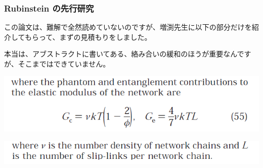 \documentclass[12pt, dvipdfmx]{beamer}
\begin{document}
\begin{frame}
    \frametitle{Rubinstein の先行研究}

        この論文は、難解で全然読めていないのですが、増渕先生に以下の部分だけを紹介してもらって、まずの見積もりをしました。

        本当は、アブストラクトに書いてある、絡み合いの緩和のほうが重要なんですが、そこまではできていません。

        \begin{center}
            \includegraphics[width=.8\textwidth]{./rubinstein_2.png}

            \includegraphics[width=.8\textwidth]{./rubinstein_3.png}
        \end{center}
\end{frame}
\end{document}
